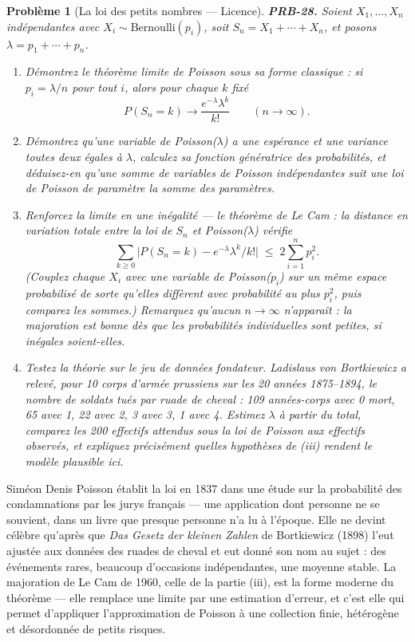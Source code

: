 \documentclass[11pt]{article}
\newtheorem{problem}{Problème}
\begin{document}
\begin{problem}[{La loi des petits nombres --- Licence}]
\textbf{PRB-28.} Soient $ X_1, \dots, X_n $ indépendantes avec $ X_i \sim
\mathrm{Bernoulli}(p_i) $, soit $ S_n = X_1 + \cdots + X_n $, et posons
$ \lambda = p_1 + \cdots + p_n $.
\begin{enumerate}
\item[(i)] Démontrez le théorème limite de Poisson sous sa forme classique : si $ p_i = \lambda/n $
pour tout $ i $, alors pour chaque $ k $ fixé
\[ P(S_n = k) \longrightarrow \frac{e^{-\lambda}\lambda^k}{k!} \qquad (n \to \infty) . \]
\item[(ii)] Démontrez qu'une variable de Poisson($ \lambda $) a une espérance et une variance toutes
deux égales à $ \lambda $, calculez sa fonction génératrice des probabilités, et déduisez-en
qu'une somme de variables de Poisson indépendantes suit une loi de Poisson de paramètre la somme
des paramètres.
\item[(iii)] Renforcez la limite en une inégalité --- le théorème de Le Cam : la distance en variation totale
entre la loi de $ S_n $ et Poisson($ \lambda $) vérifie
\[ \sum_{k \ge 0} \big| P(S_n = k) - e^{-\lambda}\lambda^k/k! \big| \;\le\; 2\sum_{i=1}^{n} p_i^2 . \]
(Couplez chaque $ X_i $ avec une variable de Poisson($ p_i $) sur un même espace probabilisé de
sorte qu'elles diffèrent avec probabilité au plus $ p_i^2 $, puis comparez les sommes.) Remarquez
qu'aucun \og{} $ n \to \infty $ \fg{} n'apparaît : la majoration est bonne dès que les probabilités
individuelles sont petites, si inégales soient-elles.
\item[(iv)] Testez la théorie sur le jeu de données fondateur. Ladislaus von Bortkiewicz a relevé, pour 10
corps d'armée prussiens sur les 20 années 1875--1894, le nombre de soldats tués par ruade de
cheval : 109 années-corps avec 0 mort, 65 avec 1, 22 avec 2, 3 avec 3, 1 avec 4. Estimez
$ \lambda $ à partir du total, comparez les 200 effectifs attendus sous la loi de Poisson aux
effectifs observés, et expliquez précisément quelles hypothèses de (iii) rendent le modèle
plausible ici.
\end{enumerate}

\end{problem}

\noindent Siméon Denis Poisson établit la loi en 1837 dans une étude sur la probabilité
des condamnations par les jurys français --- une application dont personne ne se souvient, dans un
livre que presque personne n'a lu à l'époque. Elle ne devint célèbre qu'après que
\textit{Das Gesetz der kleinen Zahlen} de Bortkiewicz (1898) l'eut ajustée aux données des ruades de
cheval et eut donné son nom au sujet : des événements rares, beaucoup d'occasions indépendantes,
une moyenne stable. La majoration de Le Cam de 1960, celle de la partie (iii), est la forme moderne
du théorème --- elle remplace une limite par une estimation d'erreur, et c'est elle qui permet
d'appliquer l'approximation de Poisson à une collection finie, hétérogène et désordonnée de petits
risques.
\end{document}
